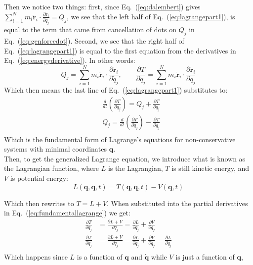 \documentclass[titlepage]{article}
\begin{document}
Then we notice two things: first, since Eq.~(\ref{eq:dalembert}) gives $\sum_{i=1}^{N}m_i\ddot{\boldsymbol{r}}_i\cdot\frac{\partial\boldsymbol{r}_i}{\partial q_j}=Q_j$, we see that the left half of Eq.~(\ref{eq:lagrangepart1}), is equal to the term that came from cancellation of dots on $Q_j$ in Eq.~(\ref{eq:genforcedot}). Second, we see that the right half of  Eq.~(\ref{eq:lagrangepart1}) is equal to the first equation from the derivatives in Eq.~(\ref{eq:energyderivative}). In other words:
\begin{equation}
	Q_j=\sum_{i=1}^{N}m_i\ddot{\boldsymbol{r}}_i\cdot\frac{\partial\dot{\boldsymbol{r}}_i}{\partial\dot{q}_j},\qquad \frac{\partial T}{\partial q_j}=\sum_{i=1}^{N}m_i\dot{\boldsymbol{r}}_i\cdot\frac{\partial\dot{\boldsymbol{r}}_i}{\partial q_j}
\end{equation}
Which then means the last line of Eq.~(\ref{eq:lagrangepart1}) substitutes to:
\begin{equation}
	\begin{split}
		&\frac{d}{dt}\left(\frac{\partial T}{\partial\dot{q}_j}\right)=Q_j+ \frac{\partial T}{\partial q_j} \\
		&Q_j=\frac{d}{dt}\left(\frac{\partial T}{\partial\dot{q}_j}\right)-\frac{\partial T}{\partial q_j} \\
	\end{split}
	\label{eq:fundamentallagrange}
\end{equation}
Which is the fundamental form of Lagrange's equations for non-conservative systems with minimal coordinates $\boldsymbol{q}$. \\

Then, to get the generalized Lagrange equation, we introduce what is known as the Lagrangian function, where $L$ is the Lagrangian, $T$ is still kinetic energy, and $V$ is potential energy:
\begin{equation}
	L(\boldsymbol{q},\dot{\boldsymbol{q}},t)=T(\boldsymbol{q},\dot{\boldsymbol{q}},t)-V(\boldsymbol{q},t)
	\label{eq:lagrangiandef}
\end{equation}

Which then rewrites to $T=L+V$. When substituted into the partial derivatives in Eq.~(\ref{eq:fundamentallagrange}) we get:
\begin{equation}
	\begin{split}
		\frac{\partial T}{\partial q_j}&=\frac{\partial L+V}{\partial q_j}=\frac{\partial L}{\partial q_j}+\frac{\partial V}{\partial q_j} \\
		\frac{\partial T}{\partial \dot{q}_j}&=\frac{\partial L+V}{\partial \dot{q}_j}=\frac{\partial L}{\partial \dot{q}_j}+\frac{\partial V}{\partial \dot{q}_j}=\frac{\partial L}{\partial \dot{q}_j} \\
	\end{split}
\end{equation}
Which happens since $L$ is a function of $\boldsymbol{q}$ and $\dot{\boldsymbol{q}}$ while $V$ is just a function of $\boldsymbol{q}$,\\
\end{document}
